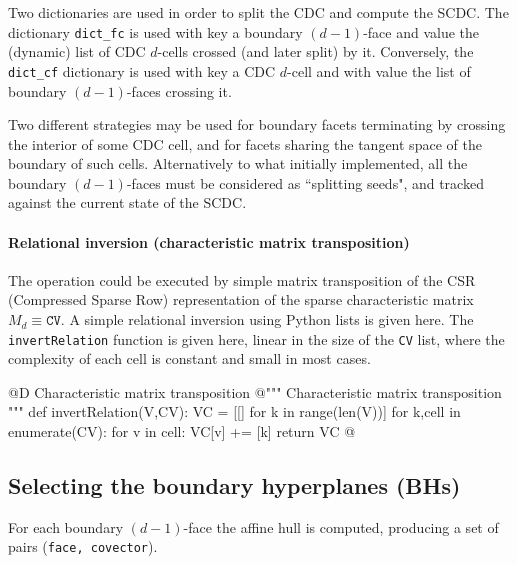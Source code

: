\documentclass[11pt,oneside]{article}	%
\begin{document}
Two dictionaries are used in order to split the CDC and compute the SCDC. The dictionary \texttt{dict\_fc} is used with key a boundary $(d-1)$-face and value the (dynamic) list of CDC $d$-cells crossed (and later split) by it. Conversely, the  \texttt{dict\_cf} dictionary is used with key a CDC $d$-cell and with value the list of boundary $(d-1)$-faces crossing it.

Two different strategies may be used for boundary facets terminating by crossing the interior of some CDC cell, and for facets sharing the tangent space of the boundary of such cells.
Alternatively to what initially implemented, all the boundary $(d-1)$-faces must be considered as ``splitting seeds", and tracked against the current state of the SCDC.


\paragraph{Relational inversion (characteristic matrix transposition)}

The operation could be executed by simple matrix transposition of the CSR (Compressed Sparse Row) representation of the sparse characteristic matrix $M_d \equiv \texttt{CV}$.
A simple relational inversion using Python lists is given here. The \texttt{invertRelation} function 
is given here, linear in the size of the \texttt{CV} list, where the complexity of each cell is constant and 
small in most cases.

@D Characteristic matrix transposition
@{""" Characteristic matrix transposition """
def invertRelation(V,CV):
	VC = [[] for k in range(len(V))]
	for k,cell in enumerate(CV):
		for v in cell:
			VC[v] += [k]
	return VC
@}


\subsection{Selecting the boundary hyperplanes (BHs)}

For each boundary $(d-1)$-face the affine hull is computed, producing a set of pairs (\texttt{face, covector}).
\end{document}
